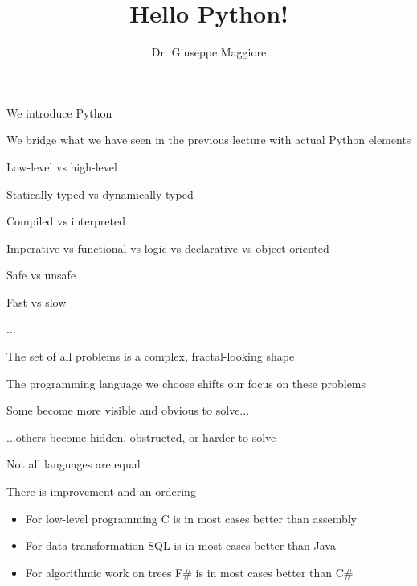 \documentclass{beamer}
\title{Hello Python!}
\author{Dr. Giuseppe Maggiore}
\institute{Hogeschool Rotterdam \\ 
Rotterdam, Netherlands}
\date{}
\begin{document}
\maketitle

\begin{slide}{
\item We introduce Python
\item We bridge what we have seen in the previous lecture with actual Python elements
}\end{slide}

\begin{slide}{
\item Low-level vs high-level
\item Statically-typed vs dynamically-typed
\item Compiled vs interpreted
\item Imperative vs functional vs logic vs declarative vs object-oriented
\item Safe vs unsafe
\item Fast vs slow
\item ...
}\end{slide}

\begin{slide}{
\item The set of all problems is a complex, fractal-looking shape
\item The programming language we choose shifts our focus on these problems
\item Some become more visible and obvious to solve...
\pause
\item ...others become hidden, obstructed, or harder to solve
}\end{slide}

\begin{slide}{
\item Not all languages are equal
\item There is improvement and an ordering
\begin{itemize}
\item For low-level programming C is in most cases better than assembly
\item For data transformation SQL is in most cases better than Java
\item For algorithmic work on trees F\# is in most cases better than C\#
\end{itemize}
}\end{slide}
\end{document}
